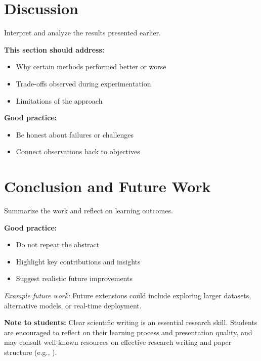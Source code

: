 \documentclass{article}
\begin{document}
\section{Discussion}

Interpret and analyze the results presented earlier.

\textbf{This section should address:}
\begin{itemize}[noitemsep]
    \item Why certain methods performed better or worse
    \item Trade-offs observed during experimentation
    \item Limitations of the approach
\end{itemize}

\textbf{Good practice:}
\begin{itemize}[noitemsep]
    \item Be honest about failures or challenges
    \item Connect observations back to objectives
\end{itemize}

\section{Conclusion and Future Work}

Summarize the work and reflect on learning outcomes.

\textbf{Good practice:}
\begin{itemize}[noitemsep]
    \item Do not repeat the abstract
    \item Highlight key contributions and insights
    \item Suggest realistic future improvements
\end{itemize}

\emph{Example future work:}
Future extensions could include exploring larger datasets, alternative models, or real-time deployment.

\textbf{Note to students:}  
Clear scientific writing is an essential research skill. Students are encouraged
to reflect on their learning process and presentation quality, and may consult
well-known resources on effective research writing and paper structure
(e.g., \cite{gopen1990science, knuth1984literate, peytonjones2003great}).
\end{document}
